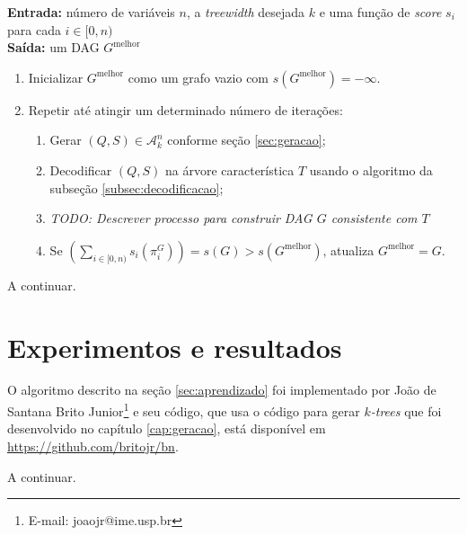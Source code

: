 \begin{algorithm}
  \textbf{Entrada:} número de variáveis $n$, a \emph{treewidth} desejada $k$ e uma função de \emph{score} $s_i$ para cada $i \in [0, n)$\\
  \textbf{Saída:} um DAG $G^{\text{melhor}}$

  \begin{enumerate}
    \item Inicializar $G^{\text{melhor}}$ como um grafo vazio com $s(G^{\text{melhor}}) = -\infty$.
    \item Repetir até atingir um determinado número de iterações:
      \begin{enumerate}
        \item Gerar $(Q, S) \in \mathcal{A}^n_k$ conforme seção \ref{sec:geracao};
        \item Decodificar $(Q, S)$ na árvore característica $T$ usando o algoritmo da subseção \ref{subsec:decodificacao};
        \item \emph{TODO: Descrever processo para construir DAG $G$ consistente com $T$} %
        \item Se $\left(\sum_{i \in [0,n)} s_i(\pi^G_{i})\right) = s(G) > s(G^{\text{melhor}})$, atualiza $G^{\text{melhor}} = G$.
      \end{enumerate}
  \end{enumerate}
\end{algorithm}

A continuar. %

\section{Experimentos e resultados}

O algoritmo descrito na seção \ref{sec:aprendizado} foi implementado por João de Santana Brito Junior\footnote{E-mail: joaojr@ime.usp.br} e seu código, que usa o código para gerar \emph{$k$-trees} que foi desenvolvido no capítulo \ref{cap:geracao}, está disponível em \url{https://github.com/britojr/bn}.

A continuar. %
